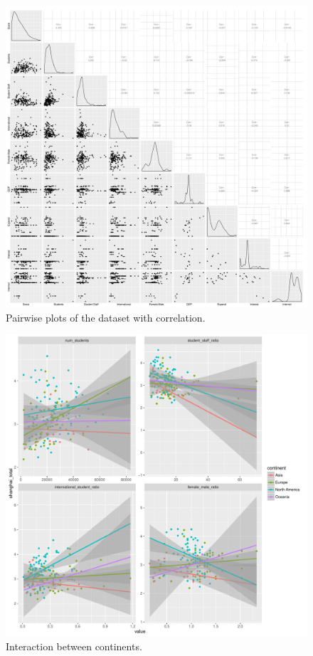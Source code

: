 \documentclass{stats_apa_style2}
\begin{document}
\begin{figure}[H]
	\includegraphics[width=\textwidth]{graphs/university-pairwise}
	\caption{Pairwise plots of the dataset with correlation.}
	\label{fig:pairwise}
\end{figure}

\begin{figure}[H]
	\includegraphics[width=\textwidth]{graphs/interaction_facets}
	\caption{Interaction between continents.}
	\label{fig:interaction}
\end{figure}
\end{document}
